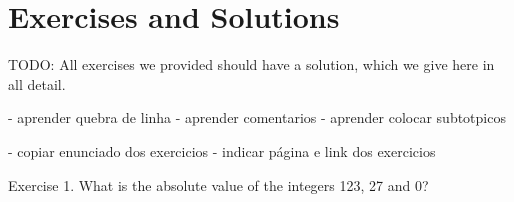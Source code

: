 \chapter{Exercises and Solutions}

TODO: All exercises we provided should have a solution, which we give here in all detail. 

- aprender quebra de linha
- aprender comentarios
- aprender colocar subtotpicos

- copiar enunciado dos exercicios 
- indicar página e link dos exercicios

Exercise 1. What is the absolute value of the integers  123, 27 and 0?

